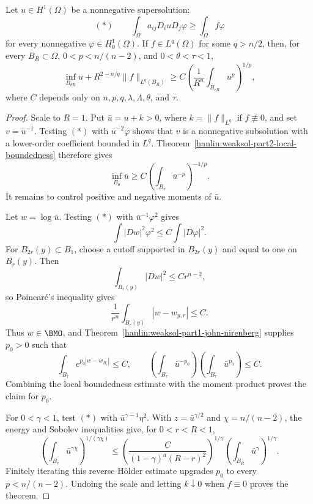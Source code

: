 \begin{theorem}\label{hanlin:weaksol-part2-weak-harnack}
Let $u\in H^1(\Omega)$ be a nonnegative supersolution:
\[
(*)\qquad
\int_\Omega a_{ij}D_i uD_j\varphi
\geq\int_\Omega f\varphi
\]
for every nonnegative $\varphi\in H^1_0(\Omega)$. If
$f\in L^q(\Omega)$ for some $q>n/2$, then, for every
$B_R\subset\Omega$, $0<p<n/(n-2)$, and $0<\theta<\tau<1$,
\[
\inf_{B_{\theta R}}u+R^{2-n/q}\|f\|_{L^q(B_R)}
\geq C\left(\frac1{R^n}\int_{B_{\tau R}}u^p\right)^{1/p},
\]
where $C$ depends only on $n,p,q,\lambda,\Lambda,\theta$, and $\tau$.
\end{theorem}
\begin{proof}
\sketch Scale to $R=1$. Put $\bar u=u+k>0$, where
$k=\|f\|_{L^q}$ if $f\not\equiv0$, and set $v=\bar u^{-1}$. Testing $(*)$
with $\bar u^{-2}\varphi$ shows that $v$ is a nonnegative subsolution with
a lower-order coefficient bounded in $L^q$.
Theorem~\ref{hanlin:weaksol-part2-local-boundedness} therefore gives
\begin{equation}
\inf_{B_\theta}\bar u
\geq C\left(\int_{B_\tau}\bar u^{-p}\right)^{-1/p}.
\end{equation}
It remains to control positive and negative moments of $\bar u$.

Let $w=\log\bar u$. Testing $(*)$ with $\bar u^{-1}\varphi^2$ gives
\begin{equation}
\int|Dw|^2\varphi^2\leq C\int|D\varphi|^2.
\end{equation}
For $B_{2r}(y)\subset B_1$, choose a cutoff supported in $B_{2r}(y)$ and
equal to one on $B_r(y)$. Then
\[
\int_{B_r(y)}|Dw|^2\leq Cr^{n-2},
\]
so Poincar\'e's inequality gives
\[
\frac1{r^n}\int_{B_r(y)}|w-w_{y,r}|\leq C.
\]
Thus $w\in\BMO$, and
Theorem~\ref{hanlin:weaksol-part1-john-nirenberg} supplies $p_0>0$ such that
\begin{equation}
\int_{B_\tau}e^{p_0|w-w_{B_\tau}|}\leq C,
\qquad
\left(\int_{B_\tau}\bar u^{-p_0}\right)
\left(\int_{B_\tau}\bar u^{p_0}\right)\leq C.
\end{equation}
Combining the local boundedness estimate with the moment product proves the
claim for $p_0$.

For $0<\gamma<1$, test $(*)$ with $\bar u^{\gamma-1}\eta^2$. With
$z=\bar u^{\gamma/2}$ and $\chi=n/(n-2)$, the energy and Sobolev
inequalities give, for $0<r<R<1$,
\begin{equation}
\left(\int_{B_r}\bar u^{\gamma\chi}\right)^{1/(\gamma\chi)}
\leq
\left(\frac{C}{(1-\gamma)^a(R-r)^2}\right)^{1/\gamma}
\left(\int_{B_R}\bar u^\gamma\right)^{1/\gamma}.
\end{equation}
Finitely iterating this reverse H\"older estimate upgrades $p_0$ to every
$p<n/(n-2)$. Undoing the scale and letting $k\downarrow0$ when
$f\equiv0$ proves the theorem.
\end{proof}

